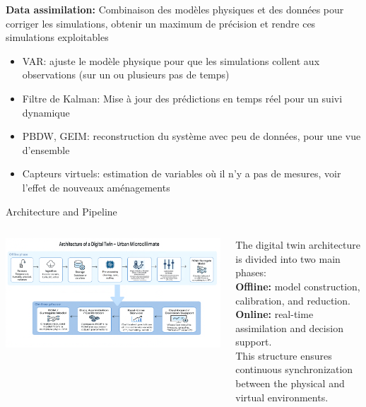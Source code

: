 \documentclass{beamer}
\begin{document}
\begin{frame}
    \small
    \textbf{Data assimilation:} Combinaison des modèles physiques et des données pour corriger les simulations, obtenir un maximum de précision et rendre ces simulations exploitables %
    \vspace{0.2cm}
    \begin{itemize}
        \item VAR: ajuste le modèle physique pour que les simulations collent aux observations (sur un ou plusieurs pas de temps)
        \item Filtre de Kalman: Mise à jour des prédictions en temps réel pour un suivi dynamique
        \item PBDW, GEIM: reconstruction du système avec peu de données, pour une vue d'ensemble
        \item Capteurs virtuels: estimation de variables où il n'y a pas de mesures, voir l'effet de nouveaux aménagements
    \end{itemize}
\end{frame}

\begin{frame}{Architecture and Pipeline}
\begin{columns}
    \begin{column}{0.55\textwidth}
        \includegraphics[width=\linewidth]{images/architecture_of_digital_twin.png}
    \end{column}
    \begin{column}{0.45\textwidth}
        \small
        The digital twin architecture is divided into two main phases:\\[4pt]
        \textbf{Offline:} model construction, calibration, and reduction.\\[3pt]
        \textbf{Online:} real-time assimilation and decision support.\\[4pt]
        This structure ensures continuous synchronization between the physical and virtual environments.
    \end{column}
\end{columns}
\end{frame}
\end{document}
